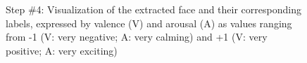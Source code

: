 \begin{figure}[H]
  \hfill
  \caption[ER pipeline step \#4: Face extraction]{Step \#4: Visualization of the extracted face and their corresponding labels, expressed by valence (V) and arousal (A) as values ranging from -1 (V: very negative; A: very calming) and +1 (V: very positive; A: very exciting)}
  \label{fig:MethodologyExtraction}
\end{figure}

